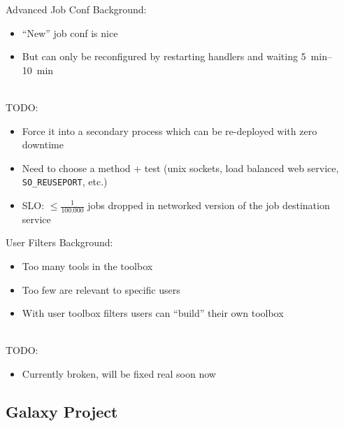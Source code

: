 \documentclass[12pt]{ufrslides}
\begin{document}
	\begin{frame}{Advanced Job Conf}
		Background:
		\begin{itemize}
			\item ``New'' job conf is nice
			\item But can only be reconfigured by restarting handlers and waiting \SIrange{5}{10}{\minute}
		\end{itemize}
		\ \\[0.5cm]
		TODO:
		\begin{itemize}
			\item Force it into a secondary process which can be re-deployed with zero downtime
			\item Need to choose a method + test  (unix sockets, load balanced web service, \texttt{SO\_REUSEPORT}, etc.)
			\item SLO: $\leq\frac{1}{100.000}$ jobs dropped in networked version of the job destination service
		\end{itemize}
	\end{frame}

	\begin{frame}{User Filters}
		Background:
		\begin{itemize}
			\item Too many tools in the toolbox
			\item Too few are relevant to specific users
			\item With user toolbox filters users can ``build'' their own toolbox
		\end{itemize}
		\ \\[0.5cm]
		TODO:
		\begin{itemize}
			\item Currently broken, will be fixed real soon now\texttrademark
		\end{itemize}
	\end{frame}

\subsection{Galaxy Project}
\end{document}
